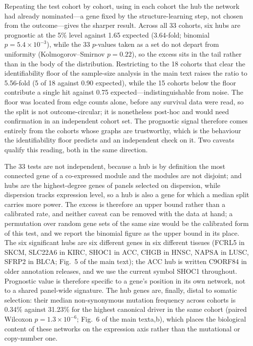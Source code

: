\documentclass[11pt]{article}
\begin{document}
Repeating the test cohort by cohort, using in each cohort the hub the network had already nominated---a gene fixed by the structure-learning step, not chosen from the outcome---gives the sharper result. Across all 33 cohorts, six hubs are prognostic at the 5\% level against 1.65 expected
(3.64-fold; binomial $p = 5.4 \times 10^{-3}$), while the 33 $p$-values taken as a set do not
depart from uniformity (Kolmogorov--Smirnov $p = 0.22$), so the excess sits in the tail rather
than in the body of the distribution. Restricting to the 18 cohorts that clear the identifiability
floor of the sample-size analysis in the main text raises the ratio to 5.56-fold (5 of 18 against 0.90
expected), while the 15 cohorts below the floor contribute a single hit against 0.75
expected---indistinguishable from noise. The floor was located from edge counts alone, before any
survival data were read, so the split is not outcome-circular; it is nonetheless post-hoc and would need confirmation in an independent cohort set. The prognostic signal therefore comes entirely from the cohorts whose graphs are
trustworthy, which is the behaviour the identifiability floor predicts and an independent check
on it. Two caveats qualify this reading, both in the same direction.

The 33 tests are not independent, because a hub is by definition the most connected gene of a
co-expressed module and the modules are not disjoint; and hubs are the highest-degree genes of
panels selected on dispersion, while dispersion tracks expression level, so a hub is also a gene
for which a median split carries more power. The excess is therefore an upper bound rather than a
calibrated rate, and neither caveat can be removed with the data at hand; a permutation over
random gene sets of the same size would be the calibrated form of this test, and we report the
binomial figure as the upper bound in its place. The six significant hubs
are six different genes in six different tissues (FCRL5 in SKCM, SLC22A6 in KIRC, SHOC1 in ACC,
CHGB in HNSC, NAPSA in LUSC, SFRP2 in BLCA; Fig.~5 of the main text); the ACC hub is written C9ORF84 in
older annotation releases, and we use the current symbol SHOC1 throughout. Prognostic value
is therefore specific to a gene's position in its own network, not to a shared panel-wide
signature. The hub genes are, finally, distal to somatic selection: their median non-synonymous mutation frequency across cohorts is 0.34\% against 31.23\% for the highest canonical driver in the same cohort (paired Wilcoxon $p = 1.3 \times 10^{-6}$; Fig.~6 of the main texta,b), which places the biological content of these networks on the expression axis rather than the mutational or copy-number one.
\end{document}
